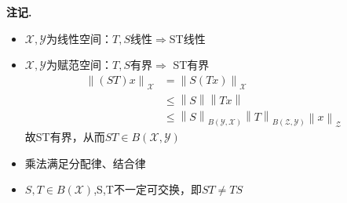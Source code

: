 \documentclass[12pt, a4paper, oneside]{ctexbook}
\newenvironment{note}{\par\noindent\textbf{注记. }}{\par}
\begin{document}
\begin{note}
\begin{itemize}
	\item $\mathscr{X},\mathscr{Y}$为线性空间：$T,S$线性$\Rightarrow $ST线性
	\item $\mathscr{X},\mathscr{Y}$为赋范空间：$T,S$有界$\Rightarrow$ ST有界\begin{align*}
		\left \| (ST)x\right \|_{\mathscr{X}}&=\left \| S(Tx)\right \|_{\mathscr{X}}\\
		&\leqslant \left \| S\right \|\left \| Tx\right \|\\
		&\leqslant \left \| S\right \|_{B(\mathscr{Y},\mathscr{X})}\left \| T\right \|_{B(\mathscr{Z},\mathscr{Y})}\left \| x\right \|_{\mathscr{Z}}
	\end{align*}
故ST有界，从而$ST\in B(\mathscr{X},\mathscr{Y})$
\item 乘法满足分配律、结合律
\item $S,T\in B(\mathscr{X})$,S,T不一定可交换，即$ST\neq TS$
\end{itemize}
\end{note}
\end{document}
